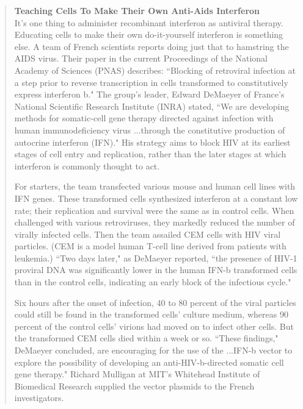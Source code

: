 \begin{singlespace}
\begin{small}
\begin{quotation}
\noindent \textbf{Teaching Cells To Make Their Own Anti-Aids Interferon} \\

It's one thing to administer recombinant interferon as antiviral therapy. Educating cells to make their own do-it-yourself interferon is something else. A team of French scientists reports doing just that to hamstring the AIDS virus. Their paper in the current Proceedings of the National Academy of Sciences (PNAS) describes: ``Blocking of retroviral infection at a step prior to reverse transcription in cells transformed to constitutively express interferon b." The group's leader, Edward DeMaeyer of France's National Scientific Research Institute (INRA) stated, ``We are developing methods for somatic-cell gene therapy directed against infection with human immunodeficiency virus ...through the constitutive production of autocrine interferon (IFN)." His strategy aims to block HIV at its earliest stages of cell entry and replication, rather than the later stages at which interferon is commonly thought to act.

For starters, the team transfected various mouse and human cell lines with IFN genes. These transformed cells synthesized interferon at a constant low rate; their replication and survival were the same as in control cells. When challenged with various retroviruses, they markedly reduced the number of virally infected cells. Then the team assailed CEM cells with HIV viral particles. (CEM is a model human T-cell line derived from patients with leukemia.) ``Two days later," as DeMaeyer reported, ``the presence of HIV-1 proviral DNA was significantly lower in the human IFN-b transformed cells than in the control cells, indicating an early block of the infectious cycle."

Six hours after the onset of infection, 40 to 80 percent of the viral particles could still be found in the transformed cells' culture medium, whereas 90 percent of the control cells' virions had moved on to infect other cells. But the transformed CEM cells died within a week or so. ``These findings," DeMaeyer concluded, are encouraging for the use of the ...IFN-b vector to explore the possibility of developing an anti-HIV-b-directed somatic cell gene therapy." Richard Mulligan at MIT's Whitehead Institute of Biomedical Research supplied the vector plasmids to the French investigators.


\end{quotation}
\end{small}
\end{singlespace}
